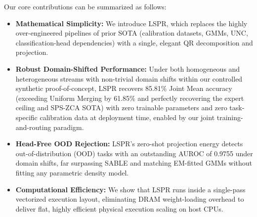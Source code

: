 Our core contributions can be summarized as follows:
\begin{itemize}
    \item \textbf{Mathematical Simplicity:} We introduce LSPR, which replaces the highly over-engineered pipelines of prior SOTA (calibration datasets, GMMs, UNC, classification-head dependencies) with a single, elegant QR decomposition and projection.
    \item \textbf{Robust Domain-Shifted Performance:} Under both homogeneous and heterogeneous streams with non-trivial domain shifts within our controlled synthetic proof-of-concept, LSPR recovers 85.81\% Joint Mean accuracy (exceeding Uniform Merging by 61.85\% and perfectly recovering the expert ceiling and SPS-ZCA SOTA) with zero trainable parameters and zero task-specific calibration data at deployment time, enabled by our joint training-and-routing paradigm.
    \item \textbf{Head-Free OOD Rejection:} LSPR's zero-shot projection energy detects out-of-distribution (OOD) tasks with an outstanding AUROC of 0.9755 under domain shifts, far surpassing SABLE and matching EM-fitted GMMs without fitting any parametric density model.
    \item \textbf{Computational Efficiency:} We show that LSPR runs inside a single-pass vectorized execution layout, eliminating DRAM weight-loading overhead to deliver flat, highly efficient physical execution scaling on host CPUs.
\end{itemize}
